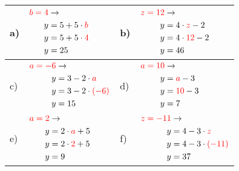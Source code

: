 \documentclass[12pt]{article}
\begin{document}
\begin{xltabular}{\textwidth}{|C{0.75cm}|X|C{0.75cm}|X|}
\hline
a)&$\begin{aligned}
\textcolor{red}{b=4} & \rightarrow\\
y&=5 + 5 \cdot \textcolor{red}{b}\\
y&=5 + 5 \cdot \textcolor{red}{4}\\
y&=25\\
\end{aligned}$
&
b)&$\begin{aligned}
\textcolor{red}{z=12} & \rightarrow\\
y&=4 \cdot \textcolor{red}{z} - 2\\
y&=4 \cdot \textcolor{red}{12} - 2\\
y&=46\\
\end{aligned}$
\\\hline
c)&$\begin{aligned}
\textcolor{red}{a=-6} & \rightarrow\\
y&=3 - 2 \cdot \textcolor{red}{a}\\
y&=3 - 2 \cdot \textcolor{red}{(-6)}\\
y&=15\\
\end{aligned}$
&
d)&$\begin{aligned}
\textcolor{red}{a=10} & \rightarrow\\
y&=\textcolor{red}{a} - 3\\
y&=\textcolor{red}{10} - 3\\
y&=7\\
\end{aligned}$
\\\hline
e)&$\begin{aligned}
\textcolor{red}{a=2} & \rightarrow\\
y&=2 \cdot \textcolor{red}{a} + 5\\
y&=2 \cdot \textcolor{red}{2} + 5\\
y&=9\\
\end{aligned}$
&
f)&$\begin{aligned}
\textcolor{red}{z=-11} & \rightarrow\\
y&=4 - 3 \cdot \textcolor{red}{z}\\
y&=4 - 3 \cdot \textcolor{red}{(-11)}\\
y&=37\\
\end{aligned}$
\\\hline

\end{xltabular}
\end{document}
